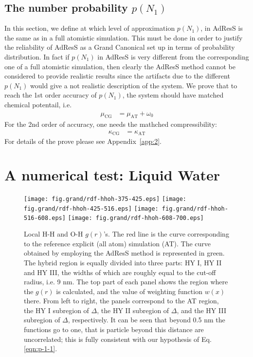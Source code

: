 \documentclass[aip,jcp,a4paper,reprint,onecolumn]{revtex4-1}
\newcommand{\bluec}[1]{{\color{blue} #1}}
\newcommand{\AT}{{\textrm{{AT}}}}
\newcommand{\CG}{{\textrm{CG}}}
\begin{document}
\subsection{The number probability $p(N_1)$}
\label{sec:pn1}
\bluec{
In this section, we define at which level of approximation $p(N_{1})$,
in AdResS is the same as in a full atomistic simulation. This must be
done in order to justify the reliability of AdResS as a Grand
Canonical set up in terms of probability distribution. In fact if
$p(N_{1})$ in AdResS is very different from the corresponding one of a
full atomistic simulation, then clearly the AdResS method cannot be
considered to provide realistic results since the artifacts due to the
different $p(N_{1})$ would give a not realistic description of the
system.
We prove that to reach the 1st order accuracy of  $p(N_{1})$,
the system should have matched chemical potentail, i.e.
\begin{align}\label{eqn:mu-eq}
  \mu_{\CG} &= \mu_{\AT} + \omega_0
\end{align}
For the 2nd order of accuracy, one needs the mathched compressibility:
\begin{align}\label{eqn:kappa-eq}
  \kappa_{\CG} &= \kappa_{\AT}
\end{align}
For details of the prove please see Appendix~\ref{app:2}.
}

\section{A numerical test: Liquid Water}
\begin{figure}
  \centering
  \texttt{[image: fig.grand/rdf-hhoh-375-425.eps]}
  \texttt{[image: fig.grand/rdf-hhoh-425-516.eps]}
  \texttt{[image: fig.grand/rdf-hhoh-516-608.eps]}
  \texttt{[image: fig.grand/rdf-hhoh-608-700.eps]}
  \caption{Local H-H and O-H $g(r)$'s.
    The red line is the curve corresponding to the reference explicit (all atom)
    simulation (AT).
    The curve obtained by employing the AdResS 
    method is represented in green.
    The hybrid region is equally
    divided into three parts: HY I, HY II and HY III, the widths of
    which are roughly equal to the cut-off radius, i.e. 9 \textsf{nm}.    
    The top part of each panel shows the region where the $g(r)$ is calculated,
    and the value of weighting function $w(x)$ there.
    From left to right, the panels correspond to the AT region, 
    the HY I subregion of $\Delta$,
    the HY II subregion of $\Delta$,
    and the HY III subregion of $\Delta$, respectively. It can be seen that beyond 0.5 \textsf{nm} the functions go to one, that is particle beyond this distance are uncorrelated; this is fully consistent with our hypothesis of Eq.\ref{eqn:p-1-1}.}
  \label{fig:tmp2a}
\end{figure}
\end{document}
